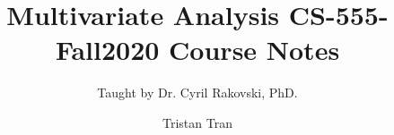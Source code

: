 \documentclass[a4paper, british]{memoir}
\title{Multivariate Analysis CS-555-Fall2020 Course Notes}
\subtitle{Taught by Dr. Cyril Rakovski, PhD.}
\author{Tristan Tran}
\begin{document}
    \frontmatter        %

    \mnfrontpage

    

    

    \cleartorecto
    \tableofcontents    %
    \cleartorecto
    \cleartorecto

    \mainmatter         %

    


    
    
    
    
    
    
    
    
    
    
    
    
    
    
    
    
    
    
    
    
    
    
    
    
    
    
    
    
    
    
    
    
    \appendix           %
    \appendixpage       %
    
    
    

    \backmatter         %

\end{document}
